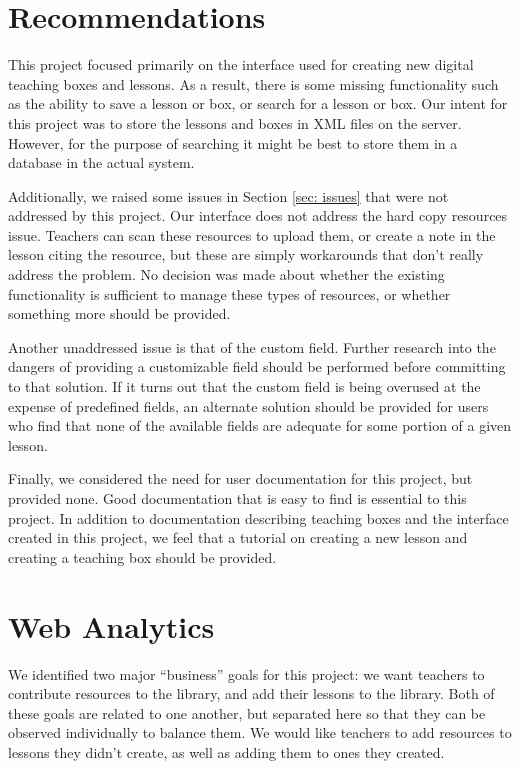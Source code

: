 \documentclass[10pt,letter]{article}
\begin{document}
\section{Recommendations}
This project focused primarily on the interface used for creating new digital
teaching boxes and lessons. As a result, there is some missing functionality
such as the ability to save a lesson or box, or search for a lesson or box. Our
intent for this project was to store the lessons and boxes in XML files on the
server. However, for the purpose of searching it might be best to store them in
a database in the actual system.

Additionally, we raised some issues in Section \ref{sec: issues} that were not
addressed by this project. Our interface does not address the hard copy
resources issue. Teachers can scan these resources to upload them, or create a
note in the lesson citing the resource, but these are simply workarounds that
don't really address the problem. No decision was made about whether the
existing functionality is sufficient to manage these types of resources, or
whether something more should be provided.

Another unaddressed issue is that of the custom field. Further research into the
dangers of providing a customizable field should be performed before committing
to that solution. If it turns out that the custom field is being overused at the
expense of predefined fields, an alternate solution should be provided for users
who find that none of the available fields are adequate for some portion of a
given lesson.

Finally, we considered the need for user documentation for this project, but
provided none. Good documentation that is easy to find is essential to this
project. In addition to documentation describing teaching boxes and the
interface created in this project, we feel that a tutorial on creating a new
lesson and creating a teaching box should be provided.

\section{Web Analytics}
We identified two major ``business'' goals for this project: we want teachers to
contribute resources to the library, and add their lessons to the library. Both
of these goals are related to one another, but separated here so that they can
be observed individually to balance them. We would like teachers to add
resources to lessons they didn't create, as well as adding them to ones they
created.
\end{document}
